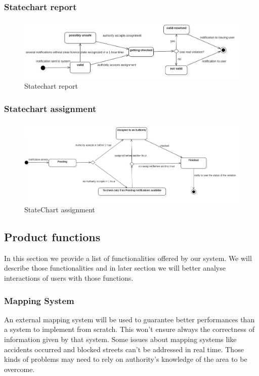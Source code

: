 \subsubsection{Statechart report}
\begin{figure}[h]
\centering
\includegraphics[width=\textwidth]{Images/statechartreport.png}
\caption{\label{fig:sc1} Statechart report}
\end{figure}
\subsubsection{Statechart assignment}
\begin{figure}[h]
\centering
\includegraphics[width=\textwidth]{Images/statechartassignment.png}
\caption{\label{fig:sc2} StateChart assignment}
\end{figure}



\subsection{Product functions}
In this section we provide a list of functionalities offered by our system. We will describe those functionalities and in later section we will better analyse interactions of users with those functions.
\subsubsection{ Mapping System }
An external mapping system will be used to guarantee better performances than a system to implement from scratch.
This won’t ensure always the correctness of information given by that system. Some issues about mapping systems like accidents occurred and blocked streets can’t be addressed in real time. Those kinds of problems may need to rely on authority’s knowledge of the area to be overcome.
